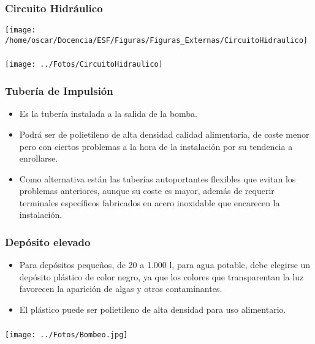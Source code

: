\documentclass[serif, xcolor=dvipsnames]{beamer}
\begin{document}
\begin{frame}
\frametitle{Circuito Hidráulico}

\begin{center}
\texttt{[image: /home/oscar/Docencia/ESF/Figuras/Figuras\_Externas/CircuitoHidraulico]}
\par\end{center}


\end{frame}

\begin{frame}[plain]
\frametitle{}

\begin{center}
\texttt{[image: ../Fotos/CircuitoHidraulico]}
\par\end{center}


\end{frame}

\begin{frame}
\frametitle{Tubería de Impulsión }
\begin{itemize}
\item Es la tubería instalada a la salida de la bomba. 
\item Podrá ser de polietileno de alta densidad calidad alimentaria, de
coste menor pero con ciertos problemas a la hora de la instalación
por su tendencia a enrollarse. 
\item Como alternativa están las tuberías autoportantes flexibles que evitan
los problemas anteriores, aunque su coste es mayor, además de requerir
terminales específicos fabricados en acero inoxidable que encarecen
la instalación. 
\end{itemize}

\end{frame}

\begin{frame}
\frametitle{Depósito elevado }
\begin{itemize}
\item Para depósitos pequeños, de 20 a 1.000 l, para agua potable, debe
elegirse un depósito plástico de color negro, ya que los colores que
transparentan la luz favorecen la aparición de algas y otros contaminantes. 
\item El plástico puede ser polietileno de alta densidad para uso alimentario.
\end{itemize}

\end{frame}

\begin{frame}[plain]
\frametitle{}

\begin{center}
\texttt{[image: ../Fotos/Bombeo.jpg]}
\par\end{center}


\end{frame}
\end{document}
